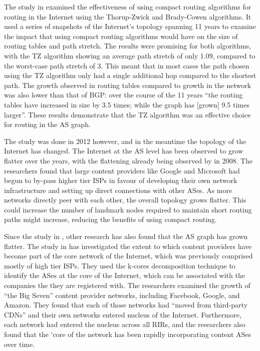 \documentclass{dissertation/mpaper}
\begin{document}
The study in \cite{strowes} examined the effectiveness of using compact routing algorithms for routing in the Internet using the Thorup-Zwick and Brady-Cowen algorithms. It used a series of snapshots of the Internet's topology spanning 11 years to examine the impact that using compact routing algorithms would have on the size of routing tables and path stretch. The results were promising for both algorithms, with the TZ algorithm showing an average path stretch of only 1.09, compared to the worst-case path stretch of 3. This meant that in most cases the path chosen using the TZ algorithm only had a single additional hop compared to the shortest path. The growth observed in routing tables compared to growth in the network was also lower than that of BGP: over the course of the 11 years ``the routing tables have increased in size by 3.5 times; while the graph has [grown] 9.5 times larger''. These results demonstrate that the TZ algorithm was an effective choice for routing in the AS graph.

The study was done in 2012 however, and in the meantime the topology of the Internet has changed. The Internet at the AS level has been observed to grow flatter over the years, with the flattening already being observed by \cite{gill} in 2008. The researchers found that large content providers like Google and Microsoft had begun to by-pass higher tier ISPs in favour of developing their own network infrastructure and setting up direct connections with other ASes. As more networks directly peer with each other, the overall topology grows flatter. This could increase the number of landmark nodes required to maintain short routing paths might increase, reducing the benefits of using compact routing. 

Since the study in \cite{gill}, other research has also found that the AS graph has grown flatter. The study in \cite{carisimo} has investigated the extent to which content providers have become part of the core network of the Internet, which was previously comprised mostly of high tier ISPs. They used the k-cores decomposition technique to identify the ASes at the core of the Internet, which can be associated with the companies the they are registered with. The researchers examined the growth of ``the Big Seven'' content provider networks, including Facebook, Google, and Amazon. They found that each of those networks had ``moved from third-party CDNs'' and their own networks entered nucleus of the Internet. Furthermore, each network had entered the nucleus across all RIRs, and the researchers also found that the `core of the network has been rapidly incorporating content ASes over time.
\end{document}
